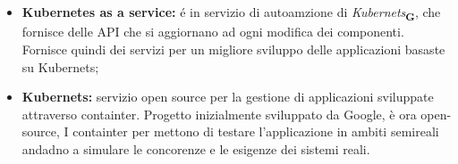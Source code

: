 \section{}
\begin{itemize}
    \item \textbf{Kubernetes as a service:} é in servizio di autoamzione di \textit{Kubernets}\textsubscript{\textbf{G}}, che fornisce delle API che si aggiornano ad ogni modifica dei componenti. Fornisce quindi dei servizi per un migliore sviluppo delle applicazioni basaste su Kubernets;
    \item \textbf{Kubernets:} servizio open source per la gestione di applicazioni sviluppate attraverso containter. Progetto inizialmente sviluppato da Google, è ora open-source, I containter per mettono di testare l'applicazione in ambiti semireali andadno a simulare le concorenze e le esigenze dei sistemi reali.
\end{itemize}
\newpage